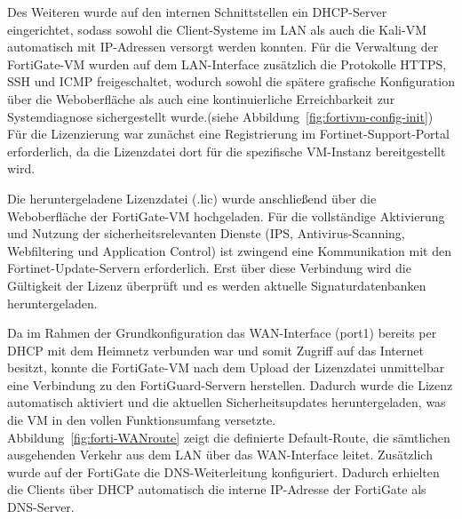 Des Weiteren wurde auf den internen Schnittstellen ein DHCP-Server eingerichtet, sodass sowohl die Client-Systeme im LAN als auch die Kali-VM automatisch mit IP-Adressen versorgt werden konnten. Für die Verwaltung der FortiGate-VM wurden auf dem LAN-Interface zusätzlich die Protokolle HTTPS, SSH und ICMP freigeschaltet, wodurch sowohl die spätere grafische Konfiguration über die Weboberfläche als auch eine kontinuierliche Erreichbarkeit zur Systemdiagnose sichergestellt wurde.(siehe Abbildung~\ref{fig:fortivm-config-init})\\

Für die Lizenzierung war zunächst eine Registrierung im Fortinet-Support-Portal erforderlich, da die Lizenzdatei dort für die spezifische VM-Instanz bereitgestellt wird.

Die heruntergeladene Lizenzdatei (.lic) wurde anschließend über die Weboberfläche der FortiGate-VM hochgeladen.
Für die vollständige Aktivierung und Nutzung der sicherheitsrelevanten Dienste (IPS, Antivirus-Scanning, Webfiltering und Application Control) ist zwingend eine Kommunikation mit den Fortinet-Update-Servern erforderlich. Erst über diese Verbindung wird die Gültigkeit der Lizenz überprüft und es werden aktuelle Signaturdatenbanken heruntergeladen.

Da im Rahmen der Grundkonfiguration das WAN-Interface (port1) bereits per DHCP mit dem Heimnetz verbunden war und somit Zugriff auf das Internet besitzt, konnte die FortiGate-VM nach dem Upload der Lizenzdatei unmittelbar eine Verbindung zu den FortiGuard-Servern herstellen. Dadurch wurde die Lizenz automatisch aktiviert und die aktuellen Sicherheitsupdates heruntergeladen, was die VM in den vollen Funktionsumfang versetzte.\\

Abbildung~\ref{fig:forti-WANroute} zeigt die definierte Default-Route, die sämtlichen ausgehenden Verkehr aus dem LAN über das WAN-Interface leitet. Zusätzlich wurde auf der FortiGate die DNS-Weiterleitung konfiguriert. Dadurch erhielten die Clients über DHCP automatisch die interne IP-Adresse der FortiGate als DNS-Server.\\


